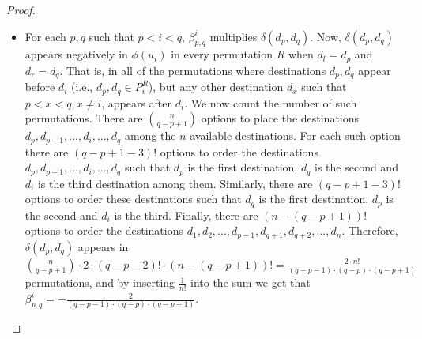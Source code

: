 \documentclass[sigconf]{aamas}
\begin{document}
\begin{proof}
\begin{itemize}
\item For each $p,q$ such that $p<i<q$, $\beta_{p,q}^i$ multiplies $\delta(d_p,d_q)$. Now, 
$\delta(d_p,d_q)$ appears negatively in $\phi(u_i)$ in every permutation $R$ when $d_l=d_p$ and $d_r=d_q$. That is, in all of the permutations where destinations $d_p, d_q$ appear before $d_i$ (i.e., $d_p,d_q \in P^R_i$), but any other destination $d_x$ such that $p<x<q, x\neq i$, appears after $d_i$. We now count the number of such permutations. There are $\binom{n}{q-p+1}$ options to place the destinations $d_p,d_{p+1},...,d_i,...,d_q$ among the $n$ available destinations. For each such option there are $(q-p+1-3)!$ options to order the destinations $d_p,d_{p+1},...,d_i,...,d_q$ such that $d_p$ is the first destination, $d_q$ is the second and $d_i$ is the third destination among them. Similarly, there are $(q-p+1-3)!$ options to order these destinations such that $d_q$ is the first destination, $d_p$ is the second and $d_i$ is the third. Finally, there are $(n-(q-p+1))!$ options to order the destinations $d_1, d_2,...,d_{p-1},d_{q+1},d_{q+2},...,d_n$. Therefore, $\delta(d_p,d_q)$ appears in $\binom{n}{q-p+1} \cdot 2 \cdot (q-p-2)! \cdot (n-(q-p+1))! =\frac{2 \cdot n!}{(q-p-1)\cdot (q-p) \cdot (q-p+1)}$ permutations, and by inserting $\frac{1}{n!}$ into the sum we get that $\beta_{p,q}^i = -\frac{2}{(q-p-1)\cdot (q-p) \cdot (q-p+1)}$.
%
\end{itemize}
\end{proof}
\end{document}
